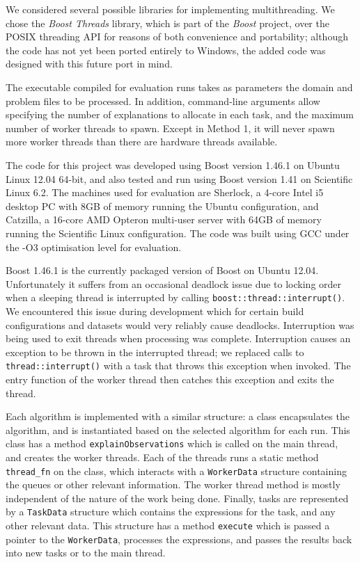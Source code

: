 \documentclass[12pt,twoside,abbrevs,msc,ai,notimes,logo,sansheadings]{infthesis}
\begin{document}
  We considered several possible libraries for implementing multithreading. We chose the \emph{Boost Threads} library\cite{bib:threads}, which is part of the \emph{Boost} project, over the POSIX threading API for reasons of both convenience and portability; although the code has not yet been ported entirely to Windows, the added code was designed with this future port in mind.
  
  The executable compiled for evaluation runs takes as parameters the domain and problem files to be processed. In addition, command-line arguments allow specifying the number of explanations to allocate in each task, and the maximum number of worker threads to spawn. Except in Method 1, it will never spawn more worker threads than there are hardware threads available.
  
  The code for this project was developed using Boost version 1.46.1 on Ubuntu Linux 12.04 64-bit, and also tested and run using Boost version 1.41 on Scientific Linux 6.2. The machines used for evaluation are Sherlock, a 4-core Intel i5 desktop PC with 8GB of memory running the Ubuntu configuration, and Catzilla, a 16-core AMD Opteron multi-user server with 64GB of memory running the Scientific Linux configuration. The code was built using GCC under the -O3 optimisation level for evaluation.
  
  Boost 1.46.1 is the currently packaged version of Boost on Ubuntu 12.04. Unfortunately it suffers from an occasional deadlock issue due to locking order when a sleeping thread is interrupted by calling \texttt{boost::thread::interrupt()}. We encountered this issue during development which for certain build configurations and datasets would very reliably cause deadlocks. Interruption was being used to exit threads when processing was complete. Interruption causes an exception to be thrown in the interrupted thread; we replaced calls to \texttt{thread::interrupt()} with a task that throws this exception when invoked. The entry function of the worker thread then catches this exception and exits the thread.
  
  Each algorithm is implemented with a similar structure: a class encapsulates the algorithm, and is instantiated based on the selected algorithm for each run. This class has a method \texttt{explainObservations} which is called on the main thread, and creates the worker threads. Each of the threads runs a static method \texttt{thread\_fn} on the class, which interacts with a \texttt{WorkerData} structure containing the queues or other relevant information. The worker thread method is mostly independent of the nature of the work being done.
  Finally, tasks are represented by a \texttt{TaskData} structure which contains the expressions for the task, and any other relevant data. This structure has a method \texttt{execute} which is passed a pointer to the \texttt{WorkerData}, processes the expressions, and passes the results back into new tasks or to the main thread.
  
\end{document}
